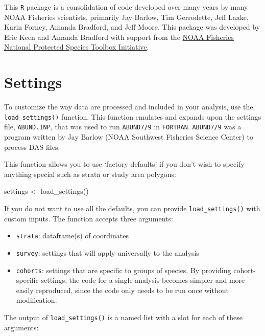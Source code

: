 \documentclass[
]{book}
\newenvironment{Shaded}{\begin{snugshade}}{\end{snugshade}}
\newcommand{\FunctionTok}[1]{\textcolor[rgb]{0.00,0.00,0.00}{#1}}
\newcommand{\NormalTok}[1]{#1}
\newcommand{\OtherTok}[1]{\textcolor[rgb]{0.56,0.35,0.01}{#1}}
\begin{document}
This \texttt{R} package is a consolidation of code developed over many years by many NOAA Fisheries scientists, primarily Jay Barlow, Tim Gerrodette, Jeff Laake, Karin Forney, Amanda Bradford, and Jeff Moore. This package was developed by Eric Keen and Amanda Bradford with support from the \href{https://www.fisheries.noaa.gov/national/population-assessments/national-protected-species-toolbox-initiative}{NOAA Fisheries National Protected Species Toolbox Initiative}.

\hypertarget{settings}{%
\chapter{Settings}\label{settings}}

To customize the way data are processed and included in your analysis, use the \texttt{load\_settings()} function. This function emulates and expands upon the settings file, \texttt{ABUND.INP}, that was used to run \texttt{ABUND7/9} in \texttt{FORTRAN}. \texttt{ABUND7/9} was a program written by Jay Barlow (NOAA Southwest Fisheries Science Center) to process DAS files.

This function allows you to use `factory defaults' if you don't wish to specify anything special such as strata or study area polygons:

\begin{Shaded}
\begin{Highlighting}[]
\NormalTok{settings }\OtherTok{\textless{}{-}} \FunctionTok{load\_settings}\NormalTok{()}
\end{Highlighting}
\end{Shaded}

If you do not want to use all the defaults, you can provide \texttt{load\_settings()} with custom inputs. The function accepts three arguments:

\begin{itemize}
\item
  \texttt{strata}: dataframe(s) of coordinates
\item
  \texttt{survey}: settings that will apply universally to the analysis
\item
  \texttt{cohorts}: settings that are specific to groups of species. By providing cohort-specific settings, the code for a single analysis becomes simpler and more easily reproduced, since the code only needs to be run once without modification.
\end{itemize}

The output of \texttt{load\_settings()} is a named list with a slot for each of these arguments:
\end{document}
